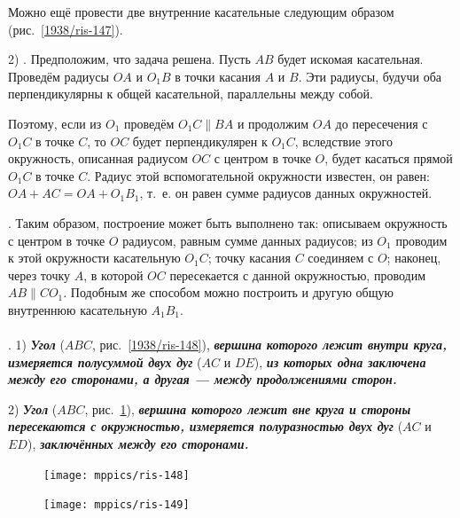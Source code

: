 \documentclass[oneside]{book}
\begin{document}
Можно ещё провести две внутренние касательные следующим образом (рис.~\ref{1938/ris-147}).

2) .
Предположим, что задача решена.
Пусть $AB$ будет искомая касательная.
Проведём радиусы $OA$ и $O_1B$ в точки касания $A$ и $B$.
Эти радиусы, будучи оба перпендикулярны к общей касательной, параллельны между собой.

Поэтому, если из $O_1$ проведём $O_1C\parallel BA$ и продолжим $OA$ до пересечения с $O_1C$ в точке $C$, то $OC$ будет перпендикулярен к $O_1C$, вследствие этого окружность, описанная радиусом $OC$ с центром в точке $O$, будет касаться прямой $O_1C$ в точке $C$.
Радиус этой вспомогательной окружности известен, он равен:
$OA+AC=OA+O_1B_1$, т.~е.
он равен сумме радиусов данных окружностей.

.
Таким образом, построение может быть выполнено так:
описываем окружность с центром в точке $O$ радиусом, равным сумме данных радиусов;
из $O_1$ проводим к этой окружности касательную $O_1C$;
точку касания $C$ соединяем с $O$;
наконец, через точку $A$, в которой $OC$ пересекается с данной окружностью, проводим $AB \parallel CO_1$.
Подобным же способом можно построить и другую общую внутреннюю касательную $A_1B_1$.

\paragraph{}\label{1938/130}
.
1) \textbf{\emph{Угол}} ($ABC$, рис.~\ref{1938/ris-148}), \textbf{\emph{вершина которого лежит внутри круга, измеряется полусуммой двух дуг}} ($AC$ и $DE$), \textbf{\emph{из которых одна заключена между его сторонами, а другая — между продолжениями сторон.}}

2) \textbf{\emph{Угол}} ($ABC$, рис.~\ref{1938/ris-149}), \textbf{\emph{вершина которого лежит вне круга и стороны пересекаются с окружностью, измеряется полуразностью двух дуг}} ($AC$ и $ED$), \textbf{\emph{заключённых между его сторонами.}}

\begin{figure}[h]
\begin{minipage}{.48\textwidth}
\centering
\texttt{[image: mppics/ris-148]}
\caption{}\label{1938/ris-148}
\end{minipage}
\hfill
\begin{minipage}{.48\textwidth}
\centering
\texttt{[image: mppics/ris-149]}
\caption{}\label{1938/ris-149}
\end{minipage}
\end{figure}
\end{document}
